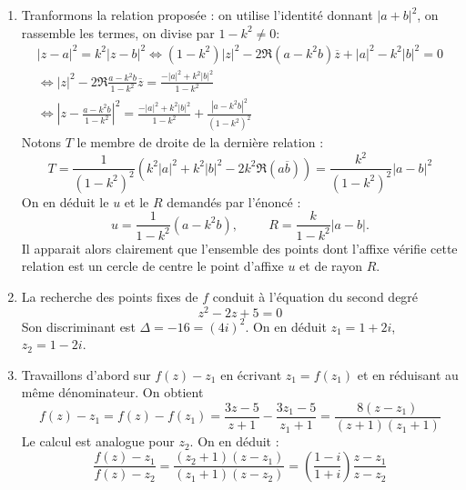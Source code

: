 \begin{enumerate}
\item Tranformons la relation proposée : on utilise l'identité donnant $|a + b|^2$, on rassemble les termes, on divise par $1-k^2\neq0$:
\begin{multline*}
 |z - a|^2 = k^2|z-b|^2
\Leftrightarrow (1-k^2)|z|^2 -2\Re(a-k^2b)\overline{z} + |a|^2-k^2|b|^2 =0 \\
\Leftrightarrow |z|^2 -2\Re\frac{a-k^2b}{1-k^2}\overline{z} = \frac{-|a|^2+k^2|b|^2}{1-k^2}\\
\Leftrightarrow \left\vert z- \frac{a-k^2b}{1-k^2} \right \vert^2 = \frac{-|a|^2+k^2|b|^2}{1-k^2} + \frac{|a-k^2b|^2}{(1-k^2)^2}
\end{multline*}
Notons $T$ le membre de droite de la dernière relation :
\begin{displaymath}
 T = \frac{1}{(1-k^2)^2}\left( k^2|a|^2+k^2|b|^2 -2k^2\Re(a\overline{b})\right)
= \frac{k^2}{(1-k^2)^2}|a-b|^2 
\end{displaymath}
On en déduit le $u$ et le $R$ demandés par l'énoncé :
\[
 u = \frac{1}{1-k^2}(a-k^2b), \hspace{1cm} R = \frac{k}{1-k^2}|a-b|. 
\]
Il apparait alors clairement que l'ensemble des points dont l'affixe vérifie cette relation est un cercle de centre le point d'affixe $u$ et de rayon $R$.

\item La recherche des points fixes de $f$ conduit à l'équation du second degré
\begin{displaymath}
 z^2 -2z +5 =0
\end{displaymath}
Son discriminant est $\Delta=-16=(4i)^2$. On en déduit $z_1 = 1 + 2i$, $z_2 = 1-2i$.

\item Travaillons d'abord sur $f(z)-z_1$ en écrivant $z_1=f(z_1)$ et en réduisant au même dénominateur. On obtient
\begin{displaymath}
 f(z)-z_1 = f(z)-f(z_1) = \frac{3z-5}{z+1} -\frac{3z_1-5}{z_1+1} = \frac{8(z-z_1)}{(z+1)(z_1+1)}
\end{displaymath}
Le calcul est analogue pour $z_2$. On en déduit :
\begin{displaymath}
 \frac{f(z)-z_1}{f(z)-z_2} = \frac{(z_2+1)(z-z_1)}{(z_1+1)(z-z_2)} = \left( \frac{1-i}{1+i}\right) \frac{z-z_1}{z-z_2}
\end{displaymath}


\end{enumerate}
